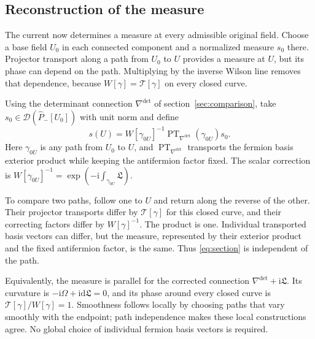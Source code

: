 \documentclass[11pt,a4paper]{article}
\theoremstyle{remark}
\newcommand{\dd}{\mathrm d}
\newcommand{\ii}{\mathrm i}
\begin{document}
\subsection{Reconstruction of the measure}
\label{sec:measure-reconstruction}

The current now determines a measure at every admissible original field.
Choose a base field $U_0$ in each connected component and a normalized
measure $s_0$ there. Projector transport along a path from $U_0$ to $U$
provides a measure at $U$, but its phase can depend on the path.
Multiplying by the inverse Wilson line removes that dependence, because
$W[\gamma]=\mathcal T[\gamma]$ on every closed curve.

Using the determinant connection $\nabla^{\det}$ of
section~\ref{sec:comparison}, take
$s_0\in\mathcal D(\widehat P_-[U_0])$ with unit norm and define
\begin{equation}
 s(U)=W[\gamma_{0U}]^{-1}
            \operatorname{PT}_{\nabla^{\det}}(\gamma_{0U})s_0 .
 \label{eq:section}
\end{equation}
Here $\gamma_{0U}$ is any path from $U_0$ to $U$, and
$\operatorname{PT}_{\nabla^{\det}}$ transports the fermion basis
exterior product while keeping the antifermion factor fixed. The scalar
correction is
$W[\gamma_{0U}]^{-1}=\exp(-\ii\int_{\gamma_{0U}}\mathfrak L)$.

To compare two paths, follow one to $U$ and return along the reverse
of the other. Their projector transports differ by
$\mathcal T[\gamma]$ for this closed curve, and their correcting
factors differ by $W[\gamma]^{-1}$. The product is one. Individual
transported basis vectors can differ, but the measure, represented by
their exterior product and the fixed antifermion factor, is the same.
Thus \eqref{eq:section} is independent of the path.

Equivalently, the measure is parallel for the corrected connection
$\nabla^{\det}+\ii\mathfrak L$. Its curvature is
$-\ii\Omega+\ii\dd\mathfrak L=0$, and its phase around every
closed curve is $\mathcal T[\gamma]/W[\gamma]=1$.
Smoothness follows locally by choosing paths that vary smoothly with
the endpoint; path independence makes these local constructions agree.
No global choice of individual fermion basis vectors is required.
\end{document}
